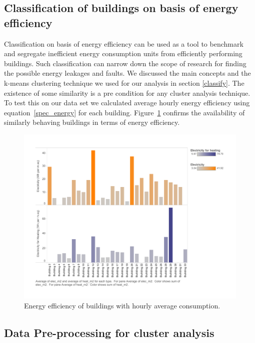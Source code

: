 \subsection{Classification of buildings on basis of energy efficiency}
Classification on basis of energy efficiency can be used as a tool to benchmark and segregate inefficient energy consumption units from efficiently performing buildings. Such classification can narrow down the scope of research for finding the possible energy leakages and faults. We discussed the main concepts and the k-means clustering technique we used for our analysis in section \ref{classify}. The existence of some similarity is a pre condition for any cluster analysis technique. To test this on our data set we calculated average hourly energy efficiency using equation~\ref{spec_energy} for each building. Figure~\ref{fig:hr_m2} confirms the availability of similarly behaving buildings in terms of energy efficiency. 
\begin{figure}[!ht]
    \begin{center}
      \includegraphics[scale = 0.6]{images/hr_m2.pdf}
      \caption{Energy efficiency of buildings with hourly average consumption.}
      \label{fig:hr_m2}
    \end{center}
\end{figure} 

\subsection{Data Pre-processing for cluster analysis}